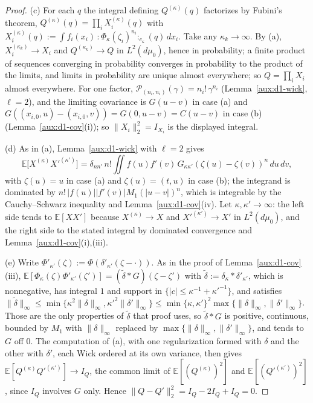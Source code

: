 \documentclass[11pt,a4paper]{article}
\theoremstyle{plain}
\theoremstyle{definition}
\theoremstyle{plain}
\theoremstyle{definition}
\newcommand{\E}{\mathbb{E}}
\newcommand{\dmu}{d\mu_0}
\begin{document}
\begin{proof}
(c) For each $q$ the integral defining $Q^{(\kappa)}(q)$ factorizes by Fubini's theorem,
$Q^{(\kappa)}(q)=\prod_iX_i^{(\kappa)}(q)$ with
$X_i^{(\kappa)}(q):=\int f_i(x_i)\,{:}\Phi_\kappa(\zeta_i)^{n_i}{:}_{c_\kappa}(q)\,dx_i$. Take any
$\kappa_k\to\infty$. By (a), $X_i^{(\kappa_k)}\to X_i$ and $Q^{(\kappa_k)}\to Q$ in $L^2(\dmu)$,
hence in probability; a finite product of sequences converging in probability converges in
probability to the product of the limits, and limits in probability are unique almost
everywhere; so $Q=\prod_iX_i$ almost everywhere. For one factor,
$\mathcal P_{(n_i,n_i)}(\gamma)=n_i!\,\gamma^{n_i}$ (Lemma~\ref{aux:d1-wick}, $\ell=2$), and the
limiting covariance is $G(u-v)$ in case (a) and $G((x_{i,0},u)-(x_{i,0},v))=G(0,u-v)=C(u-v)$ in
case (b) (Lemma~\ref{aux:d1-cov}(i)); so $\|X_i\|_2^2=I_{X_i}$ is the displayed integral.

(d) As in (a), Lemma~\ref{aux:d1-wick} with $\ell=2$ gives
\[
 \E\bigl[X^{(\kappa)}X'^{(\kappa')}\bigr]=\delta_{nn'}\,n!\iint f(u)f'(v)\,
 G_{\kappa\kappa'}(\zeta(u)-\zeta(v))^n\,du\,dv ,
\]
with $\zeta(u)=u$ in case (a) and $\zeta(u)=(t,u)$ in case (b); the integrand is dominated by $n!\,|f(u)||f'(v)|M_1(|u-v|)^n$, which is integrable by the
Cauchy--Schwarz inequality and Lemma~\ref{aux:d1-cov}(iv). Let $\kappa,\kappa'\to\infty$: the
left side tends to $\E[XX']$ because $X^{(\kappa)}\to X$ and $X'^{(\kappa')}\to X'$ in
$L^2(\dmu)$, and the right side to the stated integral by dominated convergence and
Lemma~\ref{aux:d1-cov}(i),(iii).

(e) Write $\Phi'_{\kappa'}(\zeta):=\Phi(\delta'_{\kappa'}(\zeta-\cdot))$.  As in the proof of
Lemma~\ref{aux:d1-cov}(iii), $\E[\Phi_\kappa(\zeta)\Phi'_{\kappa'}(\zeta')]=(\tilde\delta*G)
(\zeta-\zeta')$ with $\tilde\delta:=\delta_\kappa*\delta'_{\kappa'}$, which is nonnegative, has
integral $1$ and support in $\{|c|\le\kappa^{-1}+\kappa'^{-1}\}$, and satisfies
$\|\tilde\delta\|_\infty\le\min\{\kappa^2\|\delta\|_\infty,\kappa'^2\|\delta'\|_\infty\}\le
\min\{\kappa,\kappa'\}^2\max\{\|\delta\|_\infty,\|\delta'\|_\infty\}$.  Those are the only
properties of $\tilde\delta$ that proof uses, so $\tilde\delta*G$ is positive, continuous, bounded
by $M_1$ with $\|\delta\|_\infty$ replaced by $\max\{\|\delta\|_\infty,\|\delta'\|_\infty\}$, and
tends to $G$ off $0$.  The computation of (a), with one regularization formed with $\delta$ and
the other with $\delta'$, each Wick ordered at its own variance, then gives
$\E[Q^{(\kappa)}Q'^{(\kappa')}]\to I_Q$, the common limit of $\E[(Q^{(\kappa)})^2]$ and
$\E[(Q'^{(\kappa')})^2]$, since $I_Q$ involves $G$ only.  Hence
$\|Q-Q'\|_2^2=I_Q-2I_Q+I_Q=0$.


\end{proof}
\end{document}
